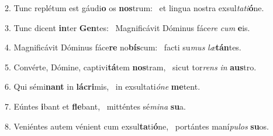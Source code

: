 2. Tunc replétum est gáudi\textbf{o} os \textbf{nos}trum: \ast\  et lingua nostra exsul\textit{ta}\textit{ti}\textbf{ó}ne.\

3. Tunc dicent \textbf{in}ter \textbf{Gen}tes: \ast\  Magnificávit Dóminus fáce\textit{re} \textit{cum} \textbf{e}is.\

4. Magnificávit Dóminus fáce\textbf{re} no\textbf{bís}cum: \ast\  facti su\textit{mus} \textit{læ}\textbf{tán}tes.\

5. Convérte, Dómine, captivi\textbf{tá}tem \textbf{nos}tram, \ast\  sicut tor\textit{rens} \textit{in} \textbf{aus}tro.\

6. Qui sémi\textbf{nant} in \textbf{lá}\textbf{cri}mis, \ast\  in exsultati\textit{ó}\textit{ne} \textbf{me}tent.\

7. Eúntes \textbf{i}bant et \textbf{fle}bant, \ast\  mitténtes sé\textit{mi}\textit{na} \textbf{su}a.\

8. Veniéntes autem vénient cum exsul\textbf{ta}ti\textbf{ó}ne, \ast\  portántes maní\textit{pu}\textit{los} \textbf{su}os.\

